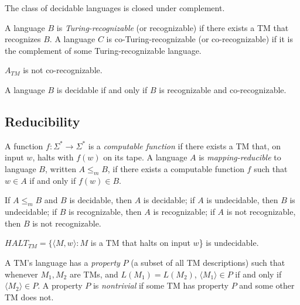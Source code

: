 \begin{theorem}
The class of decidable languages is closed under complement.
\end{theorem}

\begin{definition}
A language $B$ is \emph{Turing-recognizable} (or recognizable) if there exists a TM that recognizes $B$. A language $C$ is co-Turing-recognizable (or co-recognizable) if it is the complement of some Turing-recognizable language. 
\end{definition}

\begin{theorem}
$A_{TM}$ is not co-recognizable.
\end{theorem}

\begin{theorem}
A language $B$ is decidable if and only if $B$ is recognizable and co-recognizable.
\end{theorem}

\subsection{Reducibility}

\begin{definition}
A function $f: \Sigma^* \rightarrow \Sigma^*$ is a \emph{computable function} if there exists a TM that, on input $w$, halts with $f(w)$ on its tape. A language $A$ is \emph{mapping-reducible} to language $B$, written $A \le_m B$, if there exists a computable function $f$ such that $w \in A$ if and only if $f(w) \in B$.
\end{definition}

\begin{theorem}
If $A \le_m B$ and $B$ is decidable, then $A$ is decidable; if $A$ is undecidable, then $B$ is undecidable; if $B$ is recognizable, then $A$ is recognizable; if $A$ is not recognizable, then $B$ is not recognizable.
\end{theorem}

\begin{corollary}
$HALT_{TM} = \{\langle M, w \rangle : M$ is a TM that halts on input $w$\} is undecidable.
\end{corollary}

\begin{definition}
A TM's language has a \emph{property} $P$ (a subset of all TM descriptions) such that whenever $M_1, M_2$ are TMs, and $L(M_1) = L(M_2)$, $\langle M_1 \rangle \in P$ if and only if $\langle M_2 \rangle \in P$. A property $P$ is \emph{nontrivial} if some TM has property $P$ and some other TM does not.
\end{definition}

